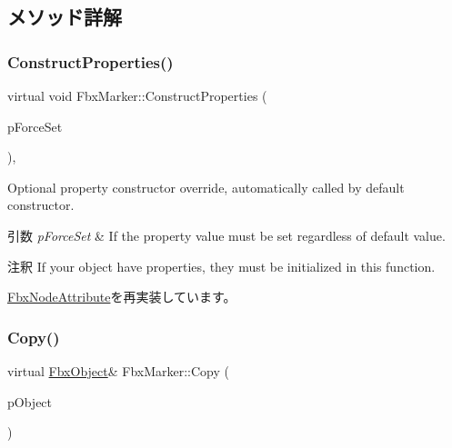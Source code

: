 \subsection{メソッド詳解}
\mbox{\label{class_fbx_marker_a02a9ec30c7dc256cce288e2f9961b507}} 
\subsubsection{\texorpdfstring{Construct\+Properties()}{ConstructProperties()}}
{\footnotesize\ttfamily virtual void Fbx\+Marker\+::\+Construct\+Properties (\begin{DoxyParamCaption}\item[{bool}]{p\+Force\+Set }\end{DoxyParamCaption})\hspace{0.3cm}{\ttfamily [protected]}, {\ttfamily [virtual]}}

Optional property constructor override, automatically called by default constructor. 
\begin{DoxyParams}{引数}
{\em p\+Force\+Set} & If the property value must be set regardless of default value. \\
\hline
\end{DoxyParams}
\begin{DoxyRemark}{注釈}
If your object have properties, they must be initialized in this function. 
\end{DoxyRemark}


\hyperlink{class_fbx_node_attribute_a042eb9949a9b9634dcc5f126e82fd04a}{Fbx\+Node\+Attribute}を再実装しています。

\mbox{\label{class_fbx_marker_a935603050774e09ec8b3d2a5200bbbc7}} 
\subsubsection{\texorpdfstring{Copy()}{Copy()}}
{\footnotesize\ttfamily virtual \hyperlink{class_fbx_object}{Fbx\+Object}\& Fbx\+Marker\+::\+Copy (\begin{DoxyParamCaption}\item[{const \hyperlink{class_fbx_object}{Fbx\+Object} \&}]{p\+Object }\end{DoxyParamCaption})\hspace{0.3cm}{\ttfamily [virtual]}}


